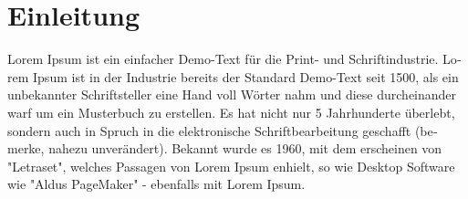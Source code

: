 \chapter{Einleitung}

\begin{german}
Lorem Ipsum ist ein einfacher Demo-Text für die Print- und Schriftindustrie. Lorem Ipsum ist in der Industrie bereits der Standard Demo-Text seit 1500, als ein unbekannter Schriftsteller eine Hand voll Wörter nahm und diese durcheinander warf um ein Musterbuch zu erstellen. Es hat nicht nur 5 Jahrhunderte überlebt, sondern auch in Spruch in die elektronische Schriftbearbeitung geschafft (bemerke, nahezu unverändert). Bekannt wurde es 1960, mit dem erscheinen von "Letraset", welches Passagen von Lorem Ipsum enhielt, so wie Desktop Software wie "Aldus PageMaker" - ebenfalls mit Lorem Ipsum.
\end{german}